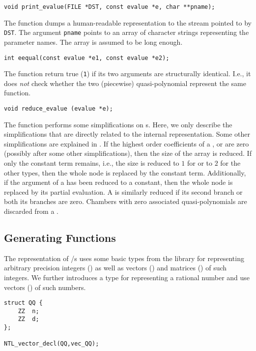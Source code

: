 \begin{verbatim}
void print_evalue(FILE *DST, const evalue *e, char **pname);
\end{verbatim}
The function  dumps a human-readable
representation to the stream pointed to by \verb+DST+.
The argument \verb+pname+ points 
to an array of character strings representing the parameter names.
The array is assumed to be long enough.

\begin{verbatim}
int eequal(const evalue *e1, const evalue *e2);
\end{verbatim}
The function  return true (\verb+1+) if its
two arguments are structurally identical.
I.e., it does {\em not\/} check whether the two
(piecewise) quasi-polynomial represent the same function.

\begin{verbatim}
void reduce_evalue (evalue *e);
\end{verbatim}
The function  performs some
simplifications on s.
Here, we only describe the simplifications that are directly
related to the internal representation.
Some other simplifications are explained in
.
If the highest order coefficients of a ,
 or  are zero (possibly
after some other simplifications), then the size of the array
is reduced.  If only the constant term remains, i.e.,
the size is reduced to $1$ for   or to $2$
for the other types, then the whole node is replaced by
the constant term.
Additionally, if the argument of a 
has been reduced to a constant, then the whole node
is replaced by its partial evaluation.
A  is similarly reduced if its second
branch or both its branches are zero.
Chambers with zero associated quasi-polynomials are
discarded from a .

\subsection{Generating Functions}

The representation of \rgf/s uses 
some basic types from the  library 
for representing arbitrary precision integers
() 
as well as vectors () and matrices ()
of such integers.
We further introduces a type  for representing a rational
number and use vectors () of such numbers.
\begin{verbatim}
struct QQ {
    ZZ	n;
    ZZ	d;
};

NTL_vector_decl(QQ,vec_QQ);
\end{verbatim}

